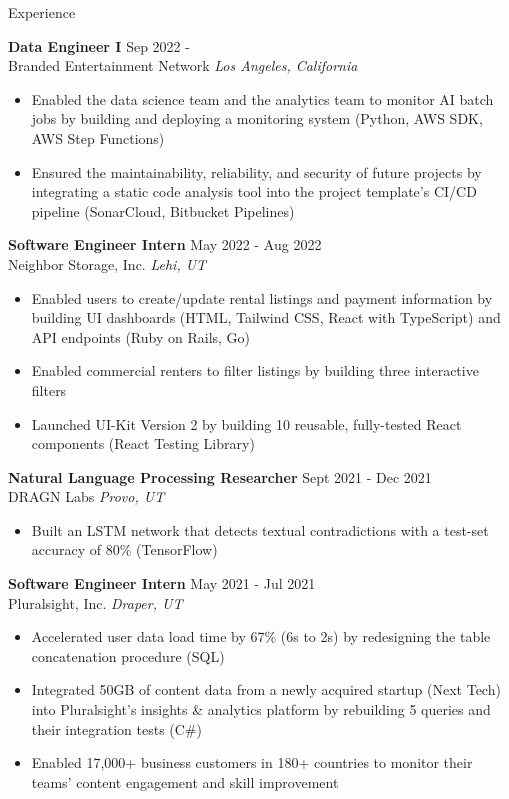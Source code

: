\documentclass{resume} %
\begin{document}
\begin{rSection}{Experience}

\textbf{Data Engineer I} \hfill Sep 2022 - \\
Branded Entertainment Network \hfill \textit{Los Angeles, California}
\begin{itemize}
   \itemsep -2pt {} 
   \item Enabled the data science team and the analytics team to monitor AI batch jobs by 
   building and deploying a monitoring system (Python, AWS SDK, AWS Step Functions)
   \item Ensured the maintainability, reliability, and security of future projects by 
   integrating a static code analysis tool into the project template's CI/CD pipeline 
   (SonarCloud, Bitbucket Pipelines)
\end{itemize}
 
\textbf{Software Engineer Intern} \hfill May 2022 - Aug 2022\\
Neighbor Storage, Inc. \hfill \textit{Lehi, UT}
 \begin{itemize}
    \itemsep -2pt {} 
    \item Enabled users to create/update rental listings and payment information by building 
    UI dashboards (HTML, Tailwind CSS, React with TypeScript) and API endpoints (Ruby on Rails, 
    Go)
    \item Enabled commercial renters to filter listings by building three interactive filters
    \item Launched UI-Kit Version 2 by building 10 reusable, fully-tested React components 
    (React Testing Library)
 \end{itemize}

\textbf{Natural Language Processing Researcher} \hfill Sept 2021 - Dec 2021\\
DRAGN Labs \hfill \textit{Provo, UT}
 \begin{itemize}
    \itemsep -2pt {} 
    \item Built an LSTM network that detects textual contradictions with a test-set accuracy of 
    80\% (TensorFlow)
 \end{itemize}

\textbf{Software Engineer Intern} \hfill May 2021 - Jul 2021\\
Pluralsight, Inc. \hfill \textit{Draper, UT}
 \begin{itemize}
    \itemsep -2pt {} 
    \item Accelerated user data load time by 67\% (6s to 2s) by redesigning the table 
    concatenation procedure (SQL)
    \item Integrated 50GB of content data from a newly acquired startup (Next Tech) into 
    Pluralsight’s insights \& analytics platform by rebuilding 5 queries and their integration 
    tests (C$\#$)
    \item Enabled 17,000+ business customers in 180+ countries to monitor their teams’ content 
    engagement and skill improvement
 \end{itemize}


\end{rSection}
\end{document}
